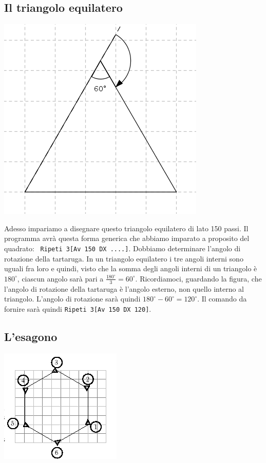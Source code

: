\subsection{Il triangolo equilatero}
\begin{center}
	\includegraphics{pics/bases-triangle.png}
\end{center}
Adesso impariamo a disegnare questo triangolo equilatero di lato 150 passi.
Il programma avrà questa forma generica che abbiamo imparato a proposito del quadrato: \lstinline! Ripeti 3[Av 150 DX ....]!.
Dobbiamo determinare l'angolo di rotazione della tartaruga. In un triangolo equilatero i tre angoli interni sono uguali fra loro e quindi, visto che la somma degli angoli interni di un triangolo è $180^{\circ}$, ciascun angolo sarà pari a $\frac{180^{\circ}}{3}=60^{\circ}$. Ricordiamoci, guardando la figura, che l'angolo di rotazione della tartaruga è l'angolo esterno, non quello interno al triangolo. L'angolo di rotazione sarà quindi $180^{\circ}-60^{\circ}=120^{\circ}$. Il comando da fornire sarà quindi \lstinline!Ripeti 3[Av 150 DX 120]!.


\subsection{L'esagono}
\begin{center}
	\includegraphics{pics/bases-hexagone.png}
\end{center}

